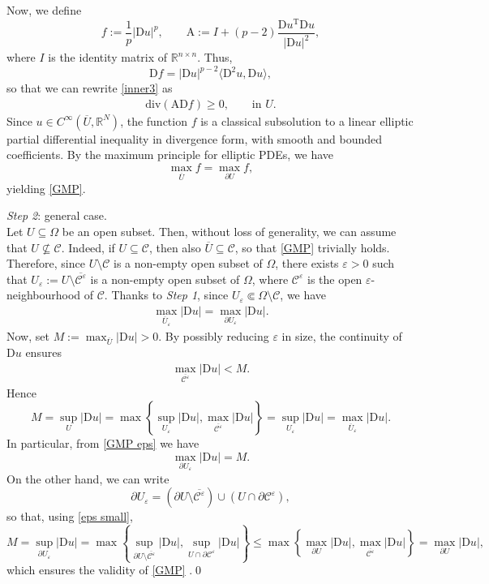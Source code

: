 \documentclass[a4paper,11pt]{article}
\numberwithin{equation}{section}
\newcommand{\numberset}{\mathbb}
\newcommand{\eps}{\varepsilon}
\newcommand{\Om}{\Omega}
\newcommand{\R}{\numberset{R}}
\newcommand{\rom}{\mathrm}
\theoremstyle{definition}
\begin{document}
Now, we define 
$$
f:=\frac1p{|\rom Du|^p}, \qquad \rom A:= I+(p-2)\frac{\rom Du^\rom T\rom Du}{|\rom Du|^2},
$$
where $I$ is the identity matrix of $\R^{n\times n}$. Thus, 
$$
\rom Df=|\rom Du|^{p-2}\langle\rom D^2u, \rom Du\rangle,
$$
so that we can rewrite \eqref{inner3} as
\begin{equation}\label{inner4}
\begin{aligned}
\rom{div}(\rom A\rom Df)\geq0, \qquad\mbox{in }U.
\end{aligned}
\end{equation}
Since $u\in C^\infty(\overline U,\R^N)$, the function $f$ is a classical subsolution to a linear elliptic partial differential inequality in divergence form, with smooth and bounded coefficients. By the maximum principle for elliptic PDEs, we have
$$
\max_{\overline U}f=\max_{\partial U}f,
$$
yielding \eqref{GMP}.

\medskip

\noindent
\textit{Step 2}: general case.\\
Let $U\subseteq\Om$ be an open subset. Then, without loss of generality, we can assume that $U\not\subseteq\mathscr C$. Indeed, if $U\subseteq\mathscr C$, then also $\overline U\subseteq\mathscr C$, so that \eqref{GMP} trivially holds. Therefore, since $U\setminus \mathscr C$ is a non-empty open subset of $\Om$, there exists $\eps>0$ such that $U_\eps:=U\setminus\overline{\mathscr C^\eps}$ is a non-empty open subset of $\Om$, where ${\mathscr C^\eps}$ is the open $\eps$-neighbourhood of ${\mathscr C}$. Thanks to \textit{Step 1}, since $U_\eps\Subset\Om\setminus \mathscr C$, we have
\begin{align}\label{GMP eps}
\max_{\overline U_\eps}|\rom Du|=\max_{\partial U_\eps}|\rom Du|.
\end{align}
Now, set $M:=\max_{\overline U}|\rom Du|>0$. By possibly reducing $\eps$ in size, the continuity of $\rom Du$ ensures
\begin{align}\label{eps small}
\max_{\overline{\mathscr C^\eps}}|\rom Du|< M.
\end{align}
Hence
$$
M=\sup_{U}|\rom Du|=\max\left\{\sup_{U_\eps}|\rom Du|,\max_{\overline{\mathscr C^\eps}}|\rom Du| \right\}=\sup_{U_\eps}|\rom Du|= \max_{ \overline{U}_\eps}|\rom Du|.
$$
In particular, from \eqref{GMP eps} we have
$$
\max_{\partial U_\eps}|\rom Du|=M.
$$
On the other hand, we can write
$$
\partial U_\eps=(\partial U\setminus\overline{\mathscr C^\eps})\cup (U\cap \partial{\mathscr C^\eps}),
$$
so that, using \eqref{eps small}, 
$$
M=\sup_{\partial U_\eps}|\rom Du|=\max\left\{\sup_{\partial U\setminus\overline{\mathscr C^\eps}}|\rom Du|, \sup_{U\cap \partial{\mathscr C^\eps}}|\rom Du|\right\}\leq\max\left\{\max_{\partial U}|\rom Du|, \max_{ \overline{\mathscr C^\eps}}|\rom Du|\right\}=\max_{\partial U}|\rom Du|,
$$
which ensures the validity of \eqref{GMP} .\qed\\
\end{document}
